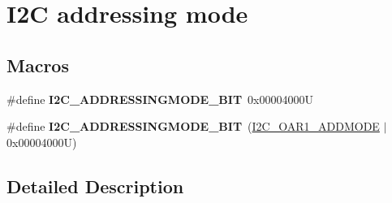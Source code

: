 \hypertarget{group___i2_c__addressing__mode}{}\section{I2C addressing mode}
\label{group___i2_c__addressing__mode}
\subsection*{Macros}
\begin{DoxyCompactItemize}
\item 
\mbox{\label{group___i2_c__addressing__mode_ga28cf3b277595ac15edf383c2574ed18d}} 
\#define {\bfseries I2\+C\+\_\+\+A\+D\+D\+R\+E\+S\+S\+I\+N\+G\+M\+O\+D\+E\+\_\+B\+IT}~0x00004000U
\item 
\mbox{\label{group___i2_c__addressing__mode_ga2401dc32e64cd53290497bab73c3608d}} 
\#define {\bfseries I2\+C\+\_\+\+A\+D\+D\+R\+E\+S\+S\+I\+N\+G\+M\+O\+D\+E\+\_\+B\+IT}~(\mbox{\hyperlink{group___peripheral___registers___bits___definition_ga7d8df80cd27313c896e887aae81fa639}{I2\+C\+\_\+\+O\+A\+R1\+\_\+\+A\+D\+D\+M\+O\+DE}} $\vert$ 0x00004000\+U)
\end{DoxyCompactItemize}


\subsection{Detailed Description}
